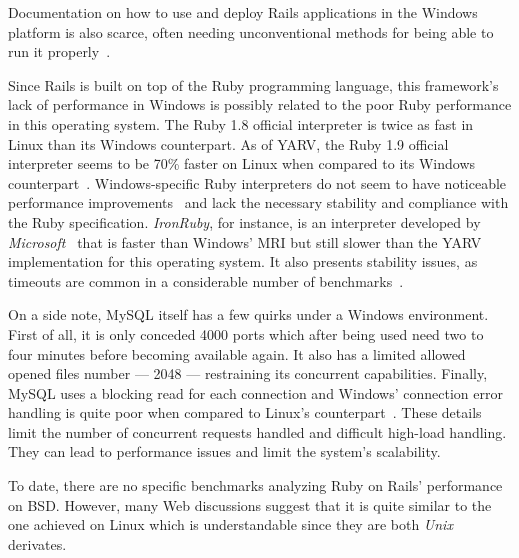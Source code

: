 Documentation on how to use and deploy Rails applications in the Windows platform is also scarce, often needing unconventional methods for being able to run it properly~\cite{rails_windows}.

Since Rails is built on top of the Ruby programming language, this framework's lack of performance in Windows is possibly related to the poor Ruby performance in this operating system. The Ruby 1.8 official interpreter is twice as fast in Linux than its Windows counterpart. As of YARV, the Ruby 1.9 official interpreter seems to be 70\% faster on Linux when compared to its Windows counterpart~\cite{ruby_faster_linux}. Windows-specific Ruby interpreters do not seem to have noticeable performance improvements~\cite{ruby.net} and lack the necessary stability and compliance with the Ruby specification. \textit{IronRuby}, for instance, is an interpreter developed by \textit{Microsoft}~\cite{ror_ecosystem_whitepaper} that is faster than Windows' MRI but still slower than the YARV implementation for this operating system. It also presents stability issues, as timeouts are common in a considerable number of benchmarks~\cite{ ironruby_performance}.

On a side note, MySQL itself has a few quirks under a Windows environment. First of all, it is only conceded 4000 ports which after being used need two to four minutes before becoming available again. It also has a limited allowed opened files number --- 2048 --- restraining its concurrent capabilities. Finally, MySQL uses a blocking read for each connection and Windows' connection error handling is quite poor when compared to Linux's counterpart~\cite{mysql_windows_linux}. These details limit the number of concurrent requests handled and difficult high-load handling. They can lead to performance issues and limit the system’s scalability.

To date, there are no specific benchmarks analyzing Ruby on Rails' performance on BSD. However, many Web discussions suggest that it is quite similar to the one achieved on Linux which is understandable since they are both \textit{Unix} derivates.
